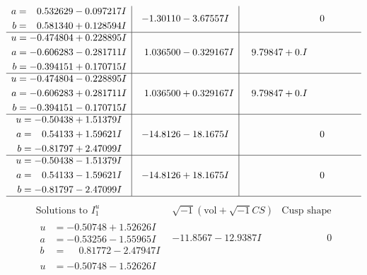 \documentclass[1p]{elsarticle_modified}
\theoremstyle{definition}
\newcommand{\I}{\sqrt{-1}}
\begin{document}
$$\begin{array}{c|c|c}
\begin{aligned}
a &= \phantom{-}0.532629 - 0.097217 I \\
b &= \phantom{-}0.581340 + 0.128594 I\end{aligned}
 & -1.30110 - 3.67557 I & \phantom{-0.000000 } 0 \\ \hline\begin{aligned}
u &= -0.474804 + 0.228895 I \\
a &= -0.606283 - 0.281711 I \\
b &= -0.394151 + 0.170715 I\end{aligned}
 & \phantom{-}1.036500 - 0.329167 I & \phantom{-}9.79847 + 0. I\phantom{ +0.000000I} \\ \hline\begin{aligned}
u &= -0.474804 - 0.228895 I \\
a &= -0.606283 + 0.281711 I \\
b &= -0.394151 - 0.170715 I\end{aligned}
 & \phantom{-}1.036500 + 0.329167 I & \phantom{-}9.79847 + 0. I\phantom{ +0.000000I} \\ \hline\begin{aligned}
u &= -0.50438 + 1.51379 I \\
a &= \phantom{-}0.54133 + 1.59621 I \\
b &= -0.81797 + 2.47099 I\end{aligned}
 & -14.8126 - 18.1675 I & \phantom{-0.000000 } 0 \\ \hline\begin{aligned}
u &= -0.50438 - 1.51379 I \\
a &= \phantom{-}0.54133 - 1.59621 I \\
b &= -0.81797 - 2.47099 I\end{aligned}
 & -14.8126 + 18.1675 I & \phantom{-0.000000 } 0\\
 \hline 
 \end{array}$$\newpage$$\begin{array}{c|c|c}  
\text{Solutions to }I^u_{1}& \I (\text{vol} + \sqrt{-1}CS) & \text{Cusp shape}\\
 \hline 
\begin{aligned}
u &= -0.50748 + 1.52626 I \\
a &= -0.53256 - 1.55965 I \\
b &= \phantom{-}0.81772 - 2.47947 I\end{aligned}
 & -11.8567 - 12.9387 I & \phantom{-0.000000 } 0 \\ \hline\begin{aligned}
u &= -0.50748 - 1.52626 I \\

\end{aligned}
\end{array}$$
\end{document}
